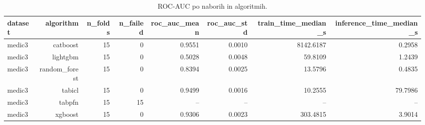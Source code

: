 \begin{table}[htbp]
\centering
\caption{ROC-AUC po naborih in algoritmih.}
\label{tab:per-dataset}
\begin{tabular}{lrrrrrrr}
\hline
dataset & algorithm & n\_folds & n\_failed & roc\_auc\_mean & roc\_auc\_std & train\_time\_median\_s & inference\_time\_median\_s \\
\hline
medic3 & catboost & 15 & 0 & 0.9551 & 0.0010 & 8142.6187 & 0.2958 \\
medic3 & lightgbm & 15 & 0 & 0.5028 & 0.0048 & 59.8109 & 1.2439 \\
medic3 & random\_forest & 15 & 0 & 0.8394 & 0.0025 & 13.5796 & 0.4835 \\
medic3 & tabicl & 15 & 0 & 0.9499 & 0.0016 & 10.2555 & 79.7986 \\
medic3 & tabpfn & 15 & 15 & -- & -- & -- & -- \\
medic3 & xgboost & 15 & 0 & 0.9306 & 0.0023 & 303.4815 & 3.9014 \\
\hline
\end{tabular}
\end{table}
